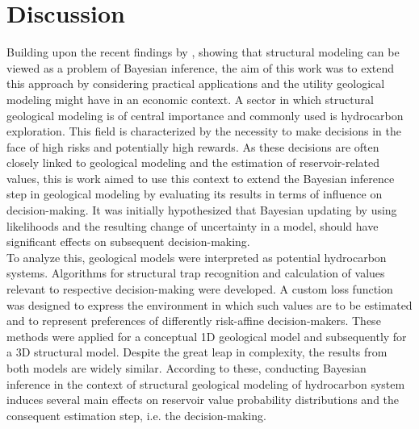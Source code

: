 	\chapter{Discussion}\label{cha:discussion}
	Building upon the recent findings by \citet{delaVarga2016}, showing that structural modeling can be viewed as a problem of Bayesian inference, the aim of this work was to extend this approach by considering practical applications and the utility geological modeling might have in an economic context. A sector in which structural geological modeling is of central importance and commonly used is hydrocarbon exploration. This field is characterized by the necessity to make decisions in the face of high risks and potentially high rewards. As these decisions are often closely linked to geological modeling and the estimation of reservoir-related values, this is work aimed to use this context to extend the Bayesian inference step in geological modeling by evaluating its results in terms of influence on decision-making. It was initially hypothesized that Bayesian updating by using likelihoods and the resulting change of uncertainty in a model, should have significant effects on subsequent decision-making.\\
	To analyze this, geological models were interpreted as potential hydrocarbon systems. Algorithms for structural trap recognition and calculation of values relevant to respective decision-making were developed. A custom loss function was designed to express the environment in which such values are to be estimated and to represent preferences of differently risk-affine decision-makers. These methods were applied for a conceptual 1D geological model and subsequently for a 3D structural model. Despite the great leap in complexity, the results from both models are widely similar. According to these, conducting Bayesian inference in the context of structural geological modeling of hydrocarbon system induces several main effects on reservoir value probability distributions and the consequent estimation step, i.e. the decision-making.\\
